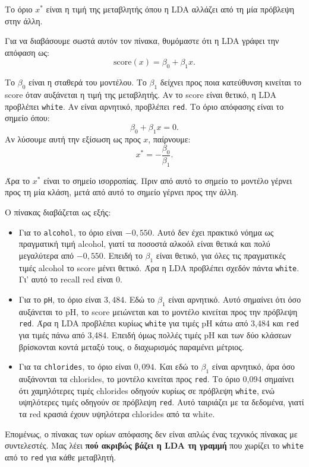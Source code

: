 \documentclass[11pt,a4paper]{article}
\newcommand{\code}[1]{\texttt{#1}}
\begin{document}
Το όριο \(x^*\) είναι η τιμή της μεταβλητής όπου η LDA αλλάζει από τη μία
πρόβλεψη στην άλλη.

Για να διαβάσουμε σωστά αυτόν τον πίνακα, θυμόμαστε ότι η LDA γράφει την
απόφαση ως:
\[
\text{score}(x) = \beta_0 + \beta_1 x.
\]

Το \(\beta_0\) είναι η σταθερά του μοντέλου. Το \(\beta_1\) δείχνει προς ποια
κατεύθυνση κινείται το score όταν αυξάνεται η τιμή της μεταβλητής. Αν το
score είναι θετικό, η LDA προβλέπει \code{white}. Αν είναι αρνητικό, προβλέπει
\code{red}. Το όριο απόφασης είναι το σημείο όπου:
\[
\beta_0 + \beta_1 x = 0.
\]
Αν λύσουμε αυτή την εξίσωση ως προς \(x\), παίρνουμε:
\[
x^* = -\frac{\beta_0}{\beta_1}.
\]

Άρα το \(x^*\) είναι το σημείο ισορροπίας. Πριν από αυτό το σημείο το μοντέλο
γέρνει προς τη μία κλάση, μετά από αυτό το σημείο γέρνει προς την άλλη.

Ο πίνακας διαβάζεται ως εξής:
\begin{itemize}
    \item Για το \code{alcohol}, το όριο είναι \(-0{,}550\). Αυτό δεν έχει
    πρακτικό νόημα ως πραγματική τιμή alcohol, γιατί τα ποσοστά αλκοόλ είναι
    θετικά και πολύ μεγαλύτερα από \(-0{,}550\). Επειδή το \(\beta_1\) είναι
    θετικό, για όλες τις πραγματικές τιμές alcohol το score μένει θετικό.
    Άρα η LDA προβλέπει σχεδόν πάντα \code{white}. Γι' αυτό το recall red
    είναι 0.

    \item Για το \code{pH}, το όριο είναι \(3{,}484\). Εδώ το \(\beta_1\)
    είναι αρνητικό. Αυτό σημαίνει ότι όσο αυξάνεται το pH, το score μειώνεται
    και το μοντέλο κινείται προς την πρόβλεψη \code{red}. Άρα η LDA προβλέπει
    κυρίως \code{white} για τιμές pH κάτω από 3,484 και \code{red} για τιμές
    πάνω από 3,484. Επειδή όμως πολλές τιμές pH και των δύο κλάσεων βρίσκονται
    κοντά μεταξύ τους, ο διαχωρισμός παραμένει μέτριος.

    \item Για τα \code{chlorides}, το όριο είναι \(0{,}094\). Και εδώ το
    \(\beta_1\) είναι αρνητικό, άρα όσο αυξάνονται τα chlorides, το μοντέλο
    κινείται προς \code{red}. Το όριο 0,094 σημαίνει ότι χαμηλότερες τιμές
    chlorides οδηγούν κυρίως σε πρόβλεψη \code{white}, ενώ υψηλότερες τιμές
    οδηγούν σε πρόβλεψη \code{red}. Αυτό ταιριάζει με τα δεδομένα, γιατί τα
    red κρασιά έχουν υψηλότερα chlorides από τα white.
\end{itemize}

Επομένως, ο πίνακας των ορίων απόφασης δεν είναι απλώς ένας τεχνικός πίνακας
με συντελεστές. Μας λέει \textbf{πού ακριβώς βάζει η LDA τη γραμμή} που
χωρίζει το \code{white} από το \code{red} για κάθε μεταβλητή.
\end{document}
